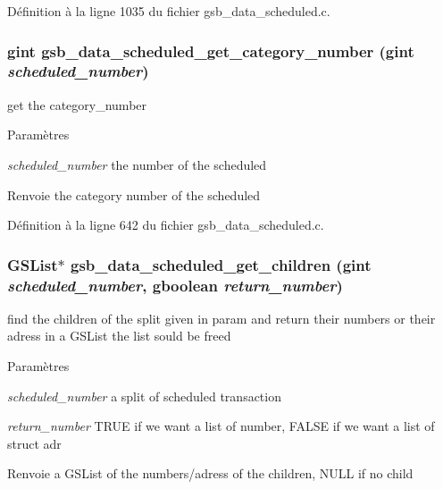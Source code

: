 Définition à la ligne 1035 du fichier gsb\_\-data\_\-scheduled.c.

\subsubsection[{gsb\_\-data\_\-scheduled\_\-get\_\-category\_\-number}]{\setlength{\rightskip}{0pt plus 5cm}gint gsb\_\-data\_\-scheduled\_\-get\_\-category\_\-number (gint {\em scheduled\_\-number})}\label{gsb__data__scheduled_8h_a6d9e3ecf8c981f4d49d7b4c3d0f5dd86}
get the category\_\-number


\begin{DoxyParams}{Paramètres}
\item[{\em scheduled\_\-number}]the number of the scheduled\end{DoxyParams}
\begin{DoxyReturn}{Renvoie}
the category number of the scheduled 
\end{DoxyReturn}


Définition à la ligne 642 du fichier gsb\_\-data\_\-scheduled.c.

\subsubsection[{gsb\_\-data\_\-scheduled\_\-get\_\-children}]{\setlength{\rightskip}{0pt plus 5cm}GSList$\ast$ gsb\_\-data\_\-scheduled\_\-get\_\-children (gint {\em scheduled\_\-number}, \/  gboolean {\em return\_\-number})}\label{gsb__data__scheduled_8h_a847827a8c847bd6f7332e7d0b2d4ecf6}
find the children of the split given in param and return their numbers or their adress in a GSList the list sould be freed


\begin{DoxyParams}{Paramètres}
\item[{\em scheduled\_\-number}]a split of scheduled transaction \item[{\em return\_\-number}]TRUE if we want a list of number, FALSE if we want a list of struct adr\end{DoxyParams}
\begin{DoxyReturn}{Renvoie}
a GSList of the numbers/adress of the children, NULL if no child 
\end{DoxyReturn}


